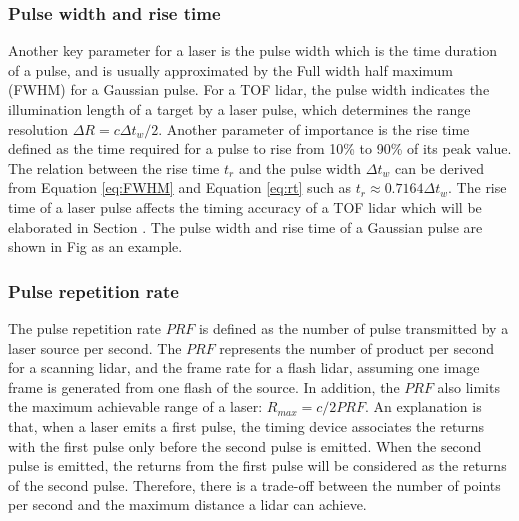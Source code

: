\subsubsection{Pulse width and rise time}
Another key parameter for a laser is the pulse width which is the time duration of a pulse, and is usually approximated by the Full width half maximum (FWHM) for a Gaussian pulse. For a TOF lidar, the pulse width indicates the illumination length of a target by a laser pulse, which determines the range resolution $\Delta R=c\Delta t_w/2$. Another parameter of importance is the rise time defined as the time required for a pulse to rise from 10\% to 90\% of its peak value. The relation between the rise time $t_r$ and the pulse width $\Delta t_w$ can be derived from Equation \eqref{eq:FWHM} and Equation \eqref{eq:rt} such as $ t_r\approx0.7164\Delta t_w$. The rise time of a laser pulse affects the timing accuracy of a TOF lidar which will be elaborated in Section . The pulse width and rise time of a Gaussian pulse are shown in Fig  as an example.
\subsubsection{Pulse repetition rate}
The pulse repetition rate $\mathit{PRF}$ is defined as the number of pulse transmitted by a laser source per second. The $\mathit{PRF}$ represents the number of product per second for a scanning lidar, and the frame rate for a flash lidar, assuming one image frame is generated from one flash of the source. In addition, the $\mathit{PRF}$ also limits the maximum achievable range of a laser: $R_{max}=c/2\mathit{PRF}$. An explanation is that, when a laser emits a first pulse, the timing device associates the returns with the first pulse only before the second pulse is emitted. When the second pulse is emitted, the returns from the first pulse will be considered as the returns of the second pulse. Therefore, there is a trade-off between the number of points per second and the maximum distance a lidar can achieve.
